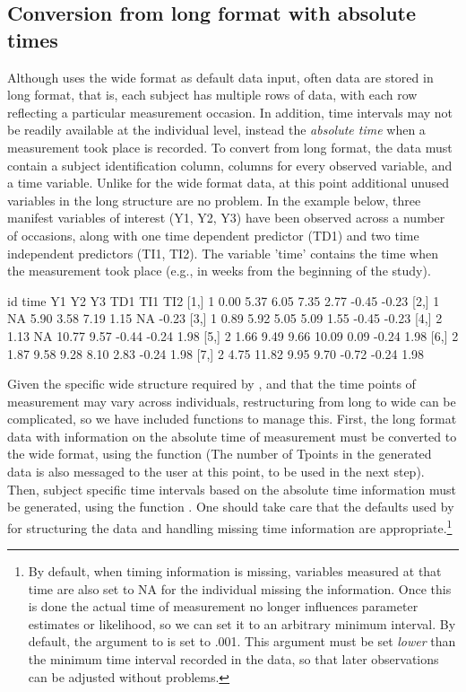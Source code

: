 \documentclass[nojss]{jss}\usepackage[]{graphicx}\usepackage[]{color}
\begin{document}
\subsection{Conversion from long format with absolute times} \label{sec:datalong}\nopagebreak 
Although  uses the wide format as default data input, often data are stored in long format, that is, each subject has multiple rows of data, with each row reflecting a particular measurement occasion. In addition, time intervals may not be readily available at the individual level, instead the \textit{absolute time} when a measurement took place is recorded. To convert from long format, the data must contain a subject identification column, columns for every observed variable, and a time variable. Unlike for the wide format data, at this point additional unused variables in the long structure are no problem. In the example below, three manifest variables of interest (Y1, Y2, Y3) have been observed across a number of occasions, along with one time dependent predictor (TD1) and two time independent predictors (TI1, TI2). The variable 'time' contains the time when the measurement took place (e.g., in weeks from the beginning of the study). 

\begin{Schunk}
\begin{Soutput}
     id time    Y1    Y2    Y3   TD1   TI1   TI2
[1,]  1 0.00  5.37  6.05  7.35  2.77 -0.45 -0.23
[2,]  1   NA  5.90  3.58  7.19  1.15    NA -0.23
[3,]  1 0.89  5.92  5.05  5.09  1.55 -0.45 -0.23
[4,]  2 1.13    NA 10.77  9.57 -0.44 -0.24  1.98
[5,]  2 1.66  9.49  9.66 10.09  0.09 -0.24  1.98
[6,]  2 1.87  9.58  9.28  8.10  2.83 -0.24  1.98
[7,]  2 4.75 11.82  9.95  9.70 -0.72 -0.24  1.98
\end{Soutput}
\end{Schunk}

Given the specific wide structure required by , and that the time points of measurement may vary across individuals, restructuring from long to wide can be complicated, so we have included functions to manage this. First, the long format data with information on the absolute time of measurement must be converted to the wide format, using the  function (The number of Tpoints in the generated data is also messaged to the user at this point, to be used in the next step). Then, subject specific time intervals based on the absolute time information must be generated, using the function . One should take care that the defaults used by  for structuring the data and handling missing time information are appropriate.\footnote{By default, when timing information is missing, variables measured at that time are also set to NA for the individual missing the information. Once this is done the actual time of measurement no longer influences parameter estimates or likelihood, so we can set it to an arbitrary minimum interval. By default, the  argument to  is set to .001. This argument must be set \textit{lower} than the minimum time interval recorded in the data, so that later observations can be adjusted without problems.}
\end{document}
